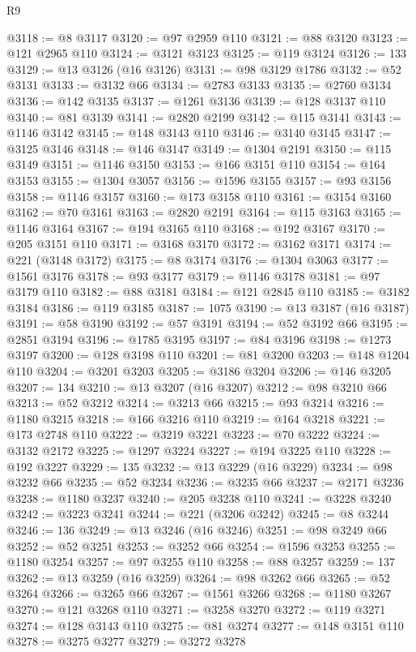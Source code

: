 \begin{lexlean}{R9}
\begin{coremodule}
@3118 := @8 @3117
@3120 := @97 @2959 @110
@3121 := @88 @3120
@3123 := @121 @2965 @110
@3124 := @3121 @3123
@3125 := @119 @3124
@3126 := 133
@3129 := @13 @3126 (@16 @3126)
@3131 := @98 @3129 @1786
@3132 := @52 @3131
@3133 := @3132 @66
@3134 := @2783 @3133
@3135 := @2760 @3134
@3136 := @142 @3135
@3137 := @1261 @3136
@3139 := @128 @3137 @110
@3140 := @81 @3139
@3141 := @2820 @2199
@3142 := @115 @3141
@3143 := @1146 @3142
@3145 := @148 @3143 @110
@3146 := @3140 @3145
@3147 := @3125 @3146
@3148 := @146 @3147
@3149 := @1304 @2191
@3150 := @115 @3149
@3151 := @1146 @3150
@3153 := @166 @3151 @110
@3154 := @164 @3153
@3155 := @1304 @3057
@3156 := @1596 @3155
@3157 := @93 @3156
@3158 := @1146 @3157
@3160 := @173 @3158 @110
@3161 := @3154 @3160
@3162 := @70 @3161
@3163 := @2820 @2191
@3164 := @115 @3163
@3165 := @1146 @3164
@3167 := @194 @3165 @110
@3168 := @192 @3167
@3170 := @205 @3151 @110
@3171 := @3168 @3170
@3172 := @3162 @3171
@3174 := @221 (@3148 @3172)
@3175 := @8 @3174
@3176 := @1304 @3063
@3177 := @1561 @3176
@3178 := @93 @3177
@3179 := @1146 @3178
@3181 := @97 @3179 @110
@3182 := @88 @3181
@3184 := @121 @2845 @110
@3185 := @3182 @3184
@3186 := @119 @3185
@3187 := 1075
@3190 := @13 @3187 (@16 @3187)
@3191 := @58 @3190
@3192 := @57 @3191
@3194 := @52 @3192 @66
@3195 := @2851 @3194
@3196 := @1785 @3195
@3197 := @84 @3196
@3198 := @1273 @3197
@3200 := @128 @3198 @110
@3201 := @81 @3200
@3203 := @148 @1204 @110
@3204 := @3201 @3203
@3205 := @3186 @3204
@3206 := @146 @3205
@3207 := 134
@3210 := @13 @3207 (@16 @3207)
@3212 := @98 @3210 @66
@3213 := @52 @3212
@3214 := @3213 @66
@3215 := @93 @3214
@3216 := @1180 @3215
@3218 := @166 @3216 @110
@3219 := @164 @3218
@3221 := @173 @2748 @110
@3222 := @3219 @3221
@3223 := @70 @3222
@3224 := @3132 @2172
@3225 := @1297 @3224
@3227 := @194 @3225 @110
@3228 := @192 @3227
@3229 := 135
@3232 := @13 @3229 (@16 @3229)
@3234 := @98 @3232 @66
@3235 := @52 @3234
@3236 := @3235 @66
@3237 := @2171 @3236
@3238 := @1180 @3237
@3240 := @205 @3238 @110
@3241 := @3228 @3240
@3242 := @3223 @3241
@3244 := @221 (@3206 @3242)
@3245 := @8 @3244
@3246 := 136
@3249 := @13 @3246 (@16 @3246)
@3251 := @98 @3249 @66
@3252 := @52 @3251
@3253 := @3252 @66
@3254 := @1596 @3253
@3255 := @1180 @3254
@3257 := @97 @3255 @110
@3258 := @88 @3257
@3259 := 137
@3262 := @13 @3259 (@16 @3259)
@3264 := @98 @3262 @66
@3265 := @52 @3264
@3266 := @3265 @66
@3267 := @1561 @3266
@3268 := @1180 @3267
@3270 := @121 @3268 @110
@3271 := @3258 @3270
@3272 := @119 @3271
@3274 := @128 @3143 @110
@3275 := @81 @3274
@3277 := @148 @3151 @110
@3278 := @3275 @3277
@3279 := @3272 @3278

\end{coremodule}
\end{lexlean}
